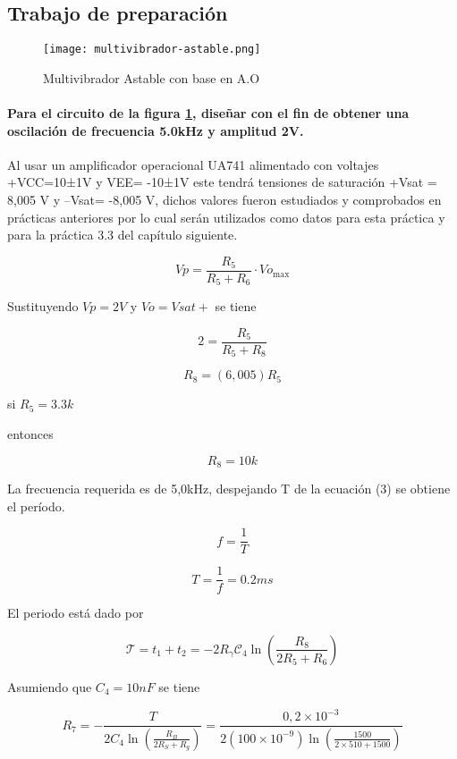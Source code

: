 \subsection{Trabajo de preparación}

\begin{figure}[ht]
    \centering
    \texttt{[image: multivibrador-astable.png]}
    \caption{Multivibrador Astable con base en A.O}
    \label{fig:multivibrador-astable}
\end{figure}

\paragraph{Para el circuito de la figura \ref{fig:multivibrador-astable}, diseñar con el fin de obtener una oscilación de frecuencia 5.0kHz y amplitud 2V.\\}

Al usar un amplificador operacional UA741 alimentado con voltajes +VCC=10±1V y                     VEE= -10±1V este tendrá tensiones de saturación +Vsat = 8,005 V y –Vsat= -8,005 V, dichos valores fueron estudiados y comprobados en prácticas anteriores por lo cual serán utilizados como datos para esta práctica y para la práctica 3.3 del capítulo siguiente. 

\begin{equation}
    Vp = \frac{R_5}{R_5 + R_6} \cdot Vo_{\text{max}}
\end{equation}

Sustituyendo $Vp= 2V$ y $Vo = Vsat+$ se tiene

$$
2 = \frac{R_5}{R_5 + R_8}
$$

$$ R_8 = (6,005)R_5$$

si $R_5 = 3.3k $

entonces 

$$ R_8 = 10k$$


La frecuencia requerida es de 5,0kHz, despejando T de la ecuación (3) se obtiene el período.

$$ f = \frac{1}{T} $$


$$ T = \frac{1}{f} = 0.2ms$$

El periodo está dado por

\[
\mathcal{T} = t_1 + t_2 = - 2 R_\gamma \mathcal{C}_4 \ln \left( \frac{R_8}{2 R_5 + R_6} \right)
\]

Asumiendo que $C_4 = 10nF$ se tiene

\[
R_7 = - \frac{T}{2C_4 \ln \left( \frac{R_B}{2R_S + R_g} \right)} = \frac{0,2 \times 10^{-3}}{2 (100 \times 10^{-9}) \ln \left( \frac{1500}{2 \times 510 + 1500} \right)}
\]

